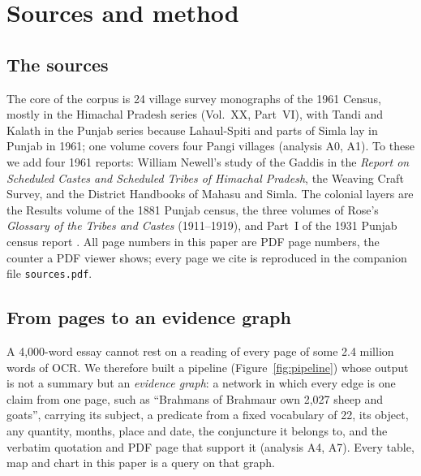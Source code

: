 \documentclass[10pt,a4paper,twocolumn]{article}
\newcommand{\an}[1]{(analysis #1)}
\begin{document}
\section{Sources and method}\label{sec:method}

\subsection{The sources}

The core of the corpus is 24 village survey monographs of the 1961 Census, mostly in the Himachal Pradesh series (Vol.~XX, Part~VI), with Tandi and Kalath in the Punjab series because Lahaul-Spiti and parts of Simla lay in Punjab in 1961; one volume covers four Pangi villages \an{A0, A1}. To these we add four 1961 reports: William Newell's study of the Gaddis in the \emph{Report on Scheduled Castes and Scheduled Tribes of Himachal Pradesh}, the Weaving Craft Survey, and the District Handbooks of Mahasu and Simla. The colonial layers are the Results volume of the 1881 Punjab census, the three volumes of Rose's \emph{Glossary of the Tribes and Castes} (1911--1919), and Part~I of the 1931 Punjab census report \citep{src-1881,src-rose,src-rose-vol3,src-rose-vol1,src-1931}. All page numbers in this paper are PDF page numbers, the counter a PDF viewer shows; every page we cite is reproduced in the companion file \texttt{sources.pdf}.

\subsection{From pages to an evidence graph}

A 4,000-word essay cannot rest on a reading of every page of some 2.4 million words of OCR. We therefore built a pipeline (Figure~\ref{fig:pipeline}) whose output is not a summary but an \emph{evidence graph}: a network in which every edge is one claim from one page, such as \enquote{Brahmans of Brahmaur own 2,027 sheep and goats}, carrying its subject, a predicate from a fixed vocabulary of 22, its object, any quantity, months, place and date, the conjuncture it belongs to, and the verbatim quotation and PDF page that support it \an{A4, A7}. Every table, map and chart in this paper is a query on that graph.
\end{document}
